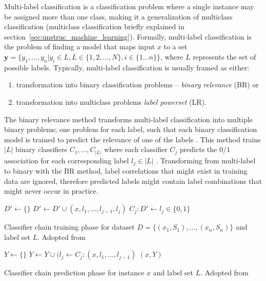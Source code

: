 Multi-label classification is a classification problem where 
a single instance may be assigned more than one class, making it 
a generalization of multiclass classification (multiclass classification briefly 
explained in section~\ref{sec:unstruc_machine_learning}).
Formally, multi-label classification is the problem of finding 
a model that maps input $x$ to a set $\mathbf{y} = \{y_1, \dots, y_n | y_i \in
L, L \in \{1, 2, \dots, N\}, i \in \{1 \dots n\} \}$, where $L$ represents the
set of possible labels.
Typically, multi-label classification is usually framed as either:
\begin{enumerate}
	\item transformation into binary classification problems -- \textit{binary relevance} (BR) \citep{luaces2012binary} or
	\item transformation into multiclass problems \textit{label powerset} (LR).
\end{enumerate}
The binary relevance method transforms multi-label classification
into multiple binary problems; one problem for each label, such that each
binary classification model is trained to predict the relevance of one of the labels
\citep{read2011classifier}. This method trains $|L|$ binary classifiers
$C_1, \dots, C_{|L|}$ where each classifier $C_j$ predicts the $0/1$ association
for each corresponding label $l_j \in |L|$ \citep{read2011classifier}.
Transforming from multi-label to binary with the BR method, label correlations
that might exist in training data are ignored, therefore predicted labels might
contain label combinations that might never occur in practice. 

\begin{algorithm}[t]
\begin{algorithmic}[1]
  \State $D' \gets \{\}$
	  \State $D' \gets D' \cup (x, l_1, \dots, l_{j - 1}, l_j)$
	  \State $C_j: D' \gets l_j \in \{0, 1\}$
	\EndFor
\EndFor
\end{algorithmic}
\caption{Classifier chain training phase for dataset 
	$D = \{(x_1, S_1), \dots, (x_n, S_n)\}$
	and label set $L$.
	Adopted from~\citep{read2011classifier}
	}

\label{alg:train_chain_classifier}
\end{algorithm}

\begin{algorithm}[t]
\begin{algorithmic}[1]
\State $Y \gets \{\}$
  \State $Y \gets Y \cup (l_j \gets C_j: (x, l_1, \dots, l_{j - 1})$
\EndFor
\Return $(x, Y)$
\end{algorithmic}
\caption{Classifier chain prediction phase for instance $x$ 
	and label set $L$.
	Adopted from~\citep{read2011classifier}
	}
\label{alg:test_chain_classifier}
\end{algorithm}

